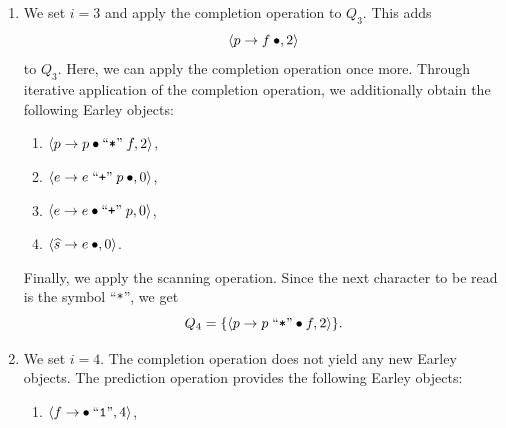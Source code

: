 \begin{enumerate}
      Next, we apply the prediction operation to $Q_2$. Since the marker precedes the variable $p$, we first
      find the following two Earley objects:   
      \[
        \pair(p \rightarrow \mdot f, 2) \quad \text{and} \quad \pair(p \rightarrow \mdot p \;\squoted{*}\; f, 2).
      \]  
      Since in the first Earley object the marker precedes the variable $f$, the prediction operation can be
      applied once more, yielding the following additional Earley objects:   
      \begin{enumerate}
      \item $\pair(f \rightarrow \mdot \squoted{1}, 2)$, 
      \item $\pair(f \rightarrow \mdot \squoted{2}, 2)$,
      \item $\pair(f \rightarrow \mdot \squoted{3}, 2)$.
      \end{enumerate}  
      Finally, we apply the scanning operation to $Q_2$. Since the third character of the string
      “\texttt{1+2*3}” is the digit “2”, $Q_3$ now takes the form   
      \[
        Q_3 = \{ \pair(f \rightarrow \squoted{2}\mdot, 2) \}.
      \]
\item We set $i = 3$ and apply the completion operation to $Q_3$. This adds  
      \[
        \pair(p \rightarrow f\mdot, 2)
      \]  
      to $Q_3$. Here, we can apply the completion operation once more. Through iterative application of the
      completion operation, we additionally obtain the following Earley objects:   
      \begin{enumerate}
      \item $\pair(p \rightarrow p \mdot \squoted{*}\; f, 2)$,
      \item $\pair(e \rightarrow e \;\squoted{+}\; p\mdot, 0)$,
      \item $\pair(e \rightarrow e \mdot \squoted{+}\; p, 0)$,
      \item $\pair(\widehat{s} \rightarrow e\mdot, 0)$.
      \end{enumerate}  
      Finally, we apply the scanning operation. Since the next character to be read is the symbol “\texttt{*}”,
      we get   
      \[
        Q_4 = \{ \pair(p \rightarrow p \;\squoted{*} \mdot f, 2) \}.
      \] 
\item We set $i = 4$. The completion operation does not yield any new Earley objects. The prediction operation
      provides the following Earley objects:   
      \begin{enumerate}
      \item $\pair(f \rightarrow \mdot \squoted{1}, 4)$, 

\end{enumerate}
\end{enumerate}
